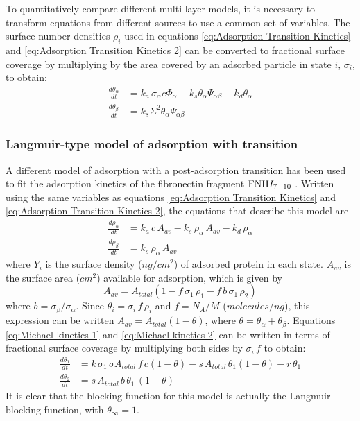 To quantitatively compare different multi-layer models, it is necessary
to transform equations from different sources to use a common set
of variables. The surface number densities $\rho_{i}$ used in equations
\ref{eq:Adsorption Transition Kinetics} and \ref{eq:Adsorption Transition Kinetics 2}
can be converted to fractional surface coverage by multiplying by
the area covered by an adsorbed particle in state $i$, $\sigma_{i}$,
to obtain:\begin{align}
\frac{d\theta_{\alpha}}{dt} & =k_{a}\,\sigma_{\alpha}c\Phi_{\alpha}-k_{s}\theta_{\alpha}\Psi_{\alpha\beta}-k_{d}\theta_{\alpha}\label{eq:dtheta_alpha dt}\\
\frac{d\theta_{\beta}}{dt} & =k_{s}\Sigma^{2}\theta_{\alpha}\Psi_{\alpha\beta}\label{eq:dtheta_beta dt}\end{align}



\subsubsection{Langmuir-type model of adsorption with transition}

A different model of adsorption with a post-adsorption transition
has been used to fit the adsorption kinetics of the fibronectin fragment
$\textrm{FNII\ensuremath{I_{7-10}}}$ \cite{Michael2003}. Written
using the same variables as equations \ref{eq:Adsorption Transition Kinetics}
and \ref{eq:Adsorption Transition Kinetics 2}, the equations that
describe this model are\begin{align}
\frac{d\rho_{\alpha}}{dt} & =k_{a}\, c\, A_{av}-k_{s}\,\rho_{\alpha}\, A_{av}-k_{d}\,\rho_{\alpha}\label{eq:Michael kinetics 1}\\
\frac{d\rho_{\beta}}{dt} & =k_{s}\,\rho_{\alpha}\, A{}_{av}\label{eq:Michael kinetics 2}\end{align}
where $Y_{i}$ is the surface density ($ng/cm^{2}$) of adsorbed protein
in each state. $A_{av}$ is the surface area ($cm^{2}$) available
for adsorption, which is given by\[
A_{av}=A_{total}\left(1-f\,\sigma_{1}\,\rho_{1}-f\, b\,\sigma_{1}\,\rho_{2}\right)\]
where $b=\sigma_{\beta}/\sigma_{\alpha}$. Since $\theta_{i}=\sigma_{i}\, f\,\rho_{i}$
and $f=N_{A}/M$ ($molecules/ng$), this expression can be written
$A_{av}=A_{total}\left(1-\theta\right)$, where $\theta=\theta_{\alpha}+\theta_{\beta}$.
Equations \ref{eq:Michael kinetics 1} and \ref{eq:Michael kinetics 2}
can be written in terms of fractional surface coverage by multiplying
both sides by $\sigma_{i}\, f$ to obtain:\begin{align}
\frac{d\theta_{1}}{dt} & =k\,\sigma_{1}\,\sigma A_{total}\, f\, c\left(1-\theta\right)-s\, A_{total}\,\theta{}_{1}\left(1-\theta\right)-r\,\theta_{1}\label{eq:Langmuir two stage 1}\\
\frac{d\theta_{2}}{dt} & =s\, A_{total}\, b\,\theta_{1}\,\left(1-\theta\right)\label{eq:Langmuir two stage 2}\end{align}
It is clear that the blocking function for this model is actually
the Langmuir blocking function, with $\theta_{\infty}=1$.

